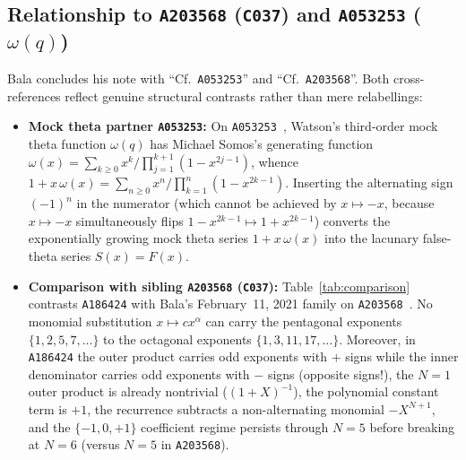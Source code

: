 \documentclass[11pt]{article}
\theoremstyle{definition}
\newcommand{\seq}[1]{\texttt{#1}}
\begin{document}
\subsection{Relationship to \seq{A203568} (\texttt{C037}) and \seq{A053253} (\texorpdfstring{$\omega(q)$}{omega(q)})}

Bala concludes his note with ``Cf.~\seq{A053253}'' and ``Cf.~\seq{A203568}''. Both cross-references reflect genuine structural contrasts rather than mere relabellings:
\begin{itemize}\setlength{\itemsep}{2pt}
\item \textbf{Mock theta partner \seq{A053253}:} On \seq{A053253}~\cite{oeis053253}, Watson's third-order mock theta function $\omega(q)$ has Michael Somos's generating function $\omega(x) = \sum_{k \ge 0} x^k / \prod_{j=1}^{k+1} (1 - x^{2j-1})$, whence $1 + x\,\omega(x) = \sum_{n \ge 0} x^n / \prod_{k=1}^n (1 - x^{2k-1})$. Inserting the alternating sign $(-1)^n$ in the numerator (which cannot be achieved by $x \mapsto -x$, because $x \mapsto -x$ simultaneously flips $1 - x^{2k-1} \mapsto 1 + x^{2k-1}$) converts the exponentially growing mock theta series $1 + x\,\omega(x)$ into the lacunary false-theta series $S(x) = F(x)$.
\item \textbf{Comparison with sibling \seq{A203568} (\texttt{C037}):} Table~\ref{tab:comparison} contrasts \seq{A186424} with Bala's February~11, 2021 family on \seq{A203568}~\cite{oeis203568}. No monomial substitution $x \mapsto c x^\alpha$ can carry the pentagonal exponents $\{1, 2, 5, 7, \dots\}$ to the octagonal exponents $\{1, 3, 11, 17, \dots\}$. Moreover, in \seq{A186424} the outer product carries odd exponents with $+$ signs while the inner denominator carries odd exponents with $-$ signs (opposite signs!), the $N = 1$ outer product is already nontrivial ($(1+X)^{-1}$), the polynomial constant term is $+1$, the recurrence subtracts a non-alternating monomial $-X^{N+1}$, and the $\{-1, 0, +1\}$ coefficient regime persists through $N = 5$ before breaking at $N = 6$ (versus $N = 5$ in \seq{A203568}).
\end{itemize}
\end{document}

